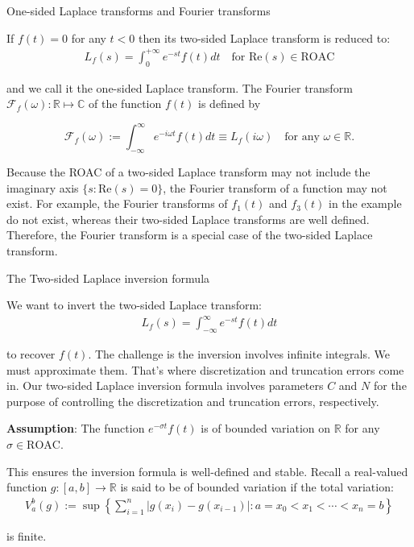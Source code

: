 \documentclass{beamer}
\begin{document}
\begin{frame}{One-sided Laplace transforms and Fourier transforms}


    {\footnotesize \footnotesize
    If \( f(t) = 0 \) for any \( t < 0 \) then its two-sided Laplace transform is reduced to:
    \begin{align*}
        L_f(s) = \int_{0}^{+\infty} e^{-st}f(t)  dt \quad \text{for Re}(s) \in \text{ROAC}
    \end{align*}

    \par and we call it the one-sided Laplace transform. The Fourier transform \emph{\( \mathcal{F}_f(\omega) : \mathbb{R} \mapsto \mathbb{C} \)} of the function \( f(t) \) is defined by

\[
\mathcal{F}_f(\omega) := \int_{-\infty}^{\infty} e^{-i\omega t}f(t)  dt \equiv L_f(i\omega) \quad \text{for any } \omega \in \mathbb{R}.
\]

\par  \pause Because the ROAC of a two-sided Laplace transform may not include the imaginary axis \(\{s : \text{Re}(s) = 0\}\), the Fourier
 transform of a function may not exist. For example, the Fourier transforms of \( f_1(t) \) and \( f_3(t) \) in the example do not exist,
  whereas their 
two-sided Laplace transforms are well defined. Therefore, the Fourier transform is a special case of the two-sided Laplace transform.
    }
    
\end{frame}

\begin{frame}{The Two-sided Laplace inversion formula}


    {\footnotesize \footnotesize
    \par We want to invert the two-sided Laplace transform:
    \begin{align*}
        L_f(s) = \int_{-\infty}^{\infty} e^{-st}f(t)  dt
    \end{align*}
    \par to recover \( f(t) \). The challenge is the inversion involves infinite integrals. We must approximate them. 
    That's where discretization and truncation errors come in. Our two-sided Laplace inversion formula involves 
    parameters \( C \) and \( N \) for the purpose of controlling the discretization and truncation errors, respectively.
    \vspace{1em}
    \par  \pause \textbf{Assumption}: The function \( e^{-\sigma t} f(t) \) is of bounded variation on \( \mathbb{R} \) for any \( \sigma \in \text{ROAC} \).
    \par This ensures the inversion formula is well-defined and stable. Recall a real-valued function \( g : [a, b] \to \mathbb{R} \) is said to be of bounded variation if the total variation:
    \begin{align*}
        V_a^b(g) := \sup \left\{ \sum_{i=1}^n |g(x_i) - g(x_{i-1})| : a = x_0 < x_1 < \cdots < x_n = b \right\}
    \end{align*}
    \par is finite.
    }
    
\end{frame}
\end{document}
